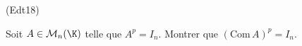 \begin{tiny}(Edt18)\end{tiny} Soit $A\in\mathcal{M}_n(\K)$ telle que $A^p=I_n$. Montrer que $(\mathrm{Com }\,A)^p = I_n$. 